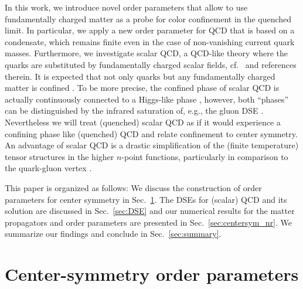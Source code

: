 \documentclass[final,twocolumn,merge,sort&compress]{elsarticle}
\begin{document}
In this work, we introduce novel order parameters that allow to use
fundamentally charged matter as a probe for color confinement in the
quenched limit. In particular, we apply a new order parameter for QCD
that is based on a condensate, which remains finite even in the case
of non-vanishing current quark masses.  Furthermore, we investigate
scalar QCD, a QCD-like theory where the quarks are substituted by
fundamentally charged scalar fields, cf.\ \cite{Fister:2010ah,
  Fister:2010yw, Macher:2011ys, Huber:2011xc, Maas:2012tj,
  Mitter:2012tpo, Hopfer:2012qr, Mitter:2013me, Hopfer:2013via,
  Maas:2013aia, Maas:2014pba, Hopfer:2014szm,Maas:2016edk,
  Maas:2016ngo} and references therein.  It is expected that not only
quarks but any fundamentally charged matter is confined
\cite{Fister:2010yw}. To be more precise, the confined phase of scalar
QCD is actually continuously connected to a Higgs-like phase
\cite{Osterwalder:1977pc, Bertle:2003pj, Langfeld:2004vu}, however,
both ``phases'' can be distinguished by the infrared saturation of,
e.g., the gluon DSE \cite{Schaden:2013ffa}.  Nevertheless we will
treat (quenched) scalar QCD as if it would experience a confining
phase like (quenched) QCD and relate confinement to center symmetry.
An advantage of scalar QCD is a drastic simplification of the (finite
temperature) tensor structures in the higher $n$-point functions,
particularly in comparison to the quark-gluon vertex
\cite{Alkofer:2008tt, Williams:2014iea, Mitter:2014wpa,
  Williams:2015cvx, Binosi:2016wcx, Aguilar:2016lbe, Cyrol:2017ewj}.


This paper is organized as follows: We discuss the construction of
order parameters for center symmetry in
Sec.~\ref{sec:construction_op}.  The DSEs for (scalar) QCD and its
solution are discussed in Sec.~\ref{sec:DSE} and our numerical results
for the matter propagators and order parameters are presented in
Sec.~\ref{sec:centersym_nr}. We summarize our findings and conclude in
Sec.~\ref{sec:summary}.

\section{Center-symmetry order parameters}
\label{sec:construction_op}
\end{document}
